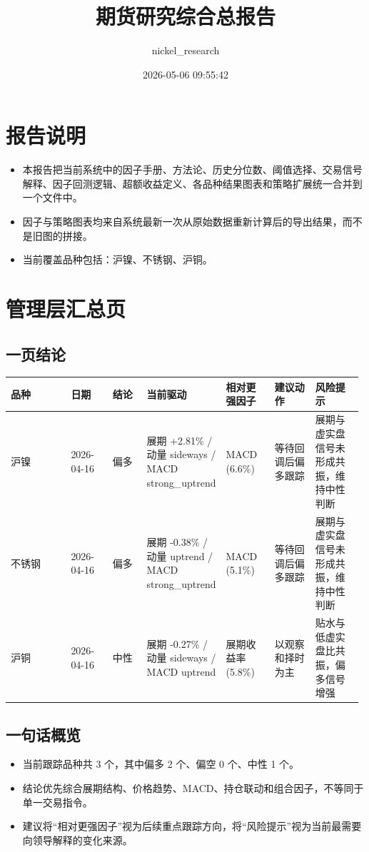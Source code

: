 \documentclass[11pt,a4paper]{ctexart}
\title{期货研究综合总报告}
\author{nickel\_research}
\date{2026-05-06 09:55:42}
\begin{document}
        \maketitle
        \tableofcontents
        \clearpage
        \section{报告说明}
        \begin{itemize}
        \item 本报告把当前系统中的因子手册、方法论、历史分位数、阈值选择、交易信号解释、因子回测逻辑、超额收益定义、各品种结果图表和策略扩展统一合并到一个文件中。
        \item 因子与策略图表均来自系统最新一次从原始数据重新计算后的导出结果，而不是旧图的拼接。
        \item 当前覆盖品种包括：沪镍、不锈钢、沪铜。
        \end{itemize}
        \section{管理层汇总页}
\subsection{一页结论}
\begin{center}
\begin{tabular}{p{0.18\linewidth}p{0.12\linewidth}p{0.10\linewidth}p{0.18\linewidth}p{0.14\linewidth}p{0.12\linewidth}p{0.14\linewidth}}
\toprule
品种 & 日期 & 结论 & 当前驱动 & 相对更强因子 & 建议动作 & 风险提示 \\
\midrule
沪镍 & 2026-04-16 & 偏多 & 展期 +2.81\% / 动量 sideways / MACD strong\_uptrend & MACD (6.6\%) & 等待回调后偏多跟踪 & 展期与虚实盘信号未形成共振，维持中性判断 \\
不锈钢 & 2026-04-16 & 偏多 & 展期 -0.38\% / 动量 uptrend / MACD strong\_uptrend & MACD (5.1\%) & 等待回调后偏多跟踪 & 展期与虚实盘信号未形成共振，维持中性判断 \\
沪铜 & 2026-04-16 & 中性 & 展期 -0.27\% / 动量 sideways / MACD uptrend & 展期收益率 (5.8\%) & 以观察和择时为主 & 贴水与低虚实盘比共振，偏多信号增强 \\
\bottomrule
\end{tabular}
\end{center}

\subsection{一句话概览}
\begin{itemize}
\item 当前跟踪品种共 3 个，其中偏多 2 个、偏空 0 个、中性 1 个。
\item 结论优先综合展期结构、价格趋势、MACD、持仓联动和组合因子，不等同于单一交易指令。
\item 建议将“相对更强因子”视为后续重点跟踪方向，将“风险提示”视为当前最需要向领导解释的变化来源。
\end{itemize}
\end{document}
